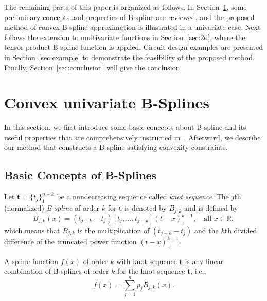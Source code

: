 \documentclass{sig-alternate}
\newcommand{\vectort}{\mathbf{t}}
\newcommand{\setR}{\mathbb{R}}
\begin{document}
The remaining parts of this paper is organized as follows. In
Section~\ref{sec:1d}, some preliminary concepts and properties of
B-spline are reviewed, and the proposed method of convex B-spline
approximation is illustrated in a univariate case. Next follows
the extension to multivariate functions in Section~\ref{sec:2d}, where the
tensor-product B-spline function is applied.
Circuit design examples are presented in Section~\ref{sec:example} to
demonstrate the feasibility of the proposed method. Finally,
Section~\ref{sec:conclusion} will give the conclusion.

\section{Convex univariate B-Splines}\label{sec:1d}
In this section, we first
introduce some basic concepts about B-spline and its useful properties
that are comprehensively instructed in~\cite{PGS}. Afterward, we
describe our 
method that constructs a B-spline satisfying convexity constraints. 

\subsection{Basic Concepts of B-Splines}
Let $\vectort = \{t_j\}_1^{n+k}$ be a nondecreasing sequence called
\emph{knot sequence}. The $j$th (normalized) 
\emph{B-spline} of order $k$ for $\vectort$ is denoted by $B_{j,k}$ and is
defined by  
\begin{equation}
B_{j,k}(x) = (t_{j+k}-t_j)[t_j,\ldots,t_{j+k}](t-x)_+^{k-1},\quad
\textrm{all } x \in \setR,
\end{equation}
which means that $B_{j,k}$ is the multiplication of $(t_{j+k}-t_j)$
and the $k$th divided difference of the truncated power function
$(t-x)_+^{k-1}$.

A spline function $f(x)$ of order $k$ with knot sequence $\vectort$ is any
linear combination of B-splines of order $k$ for the knot sequence
$\vectort$, i.e.,
\begin{equation}\label{eqn:spline_fn}
f(x)=\sum_{j=1}^n{p_{j} B_{j,k}(x)}.
\end{equation}
\end{document}
